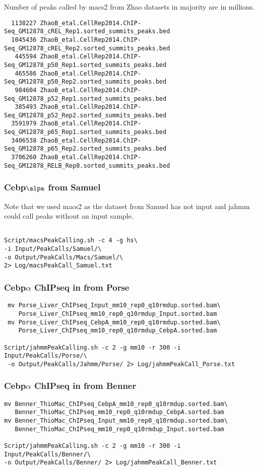 \documentclass{article}\usepackage[]{graphicx}\usepackage[]{color}
\begin{document}
Number of peaks called by macs2 from Zhao datasets in majority are in millions. 
\begin{verbatim}
  1138227 ZhaoB_etal.CellRep2014.ChIP-Seq_GM12878_cREL_Rep1.sorted_summits_peaks.bed
  1045436 ZhaoB_etal.CellRep2014.ChIP-Seq_GM12878_cREL_Rep2.sorted_summits_peaks.bed
   445594 ZhaoB_etal.CellRep2014.ChIP-Seq_GM12878_p50_Rep1.sorted_summits_peaks.bed
   465586 ZhaoB_etal.CellRep2014.ChIP-Seq_GM12878_p50_Rep2.sorted_summits_peaks.bed
   984604 ZhaoB_etal.CellRep2014.ChIP-Seq_GM12878_p52_Rep1.sorted_summits_peaks.bed
   385493 ZhaoB_etal.CellRep2014.ChIP-Seq_GM12878_p52_Rep2.sorted_summits_peaks.bed
  3591979 ZhaoB_etal.CellRep2014.ChIP-Seq_GM12878_p65_Rep1.sorted_summits_peaks.bed
  3406538 ZhaoB_etal.CellRep2014.ChIP-Seq_GM12878_p65_Rep2.sorted_summits_peaks.bed
  3706260 ZhaoB_etal.CellRep2014.ChIP-Seq_GM12878_RELB_Rep0.sorted_summits_peaks.bed
\end{verbatim}

\subsubsection{Cebp$\alpa$ from Samuel}

Note that we used macs2 as the dataset from Samuel has not input and jahmm could call peaks without an input sample.

\begin{verbatim}

Script/macsPeakCalling.sh -c 4 -g hs\ 
-i Input/PeakCalls/Samuel/\ 
-o Output/PeakCalls/Macs/Samuel/\ 
2> Log/macsPeakCall_Samuel.txt

\end{verbatim}


\subsubsection{Cebp$\alpha$ ChIPseq in from Porse}
\begin{verbatim}
 mv Porse_Liver_ChIPseq_Input_mm10_rep0_q10rmdup.sorted.bam\
    Porse_Liver_ChIPseq_mm10_rep0_q10rmdup_Input.sorted.bam 
 mv Porse_Liver_ChIPseq_CebpA_mm10_rep0_q10rmdup.sorted.bam\ 
    Porse_Liver_ChIPseq_mm10_rep0_q10rmdup_CebpA.sorted.bam 

Script/jahmmPeakCalling.sh -c 2 -g mm10 -r 300 -i Input/PeakCalls/Porse/\ 
 -o Output/PeakCalls/Jahmm/Porse/ 2> Log/jahmmPeakCall_Porse.txt
\end{verbatim}

\subsubsection{Cebp$\alpha$ ChIPseq in from Benner}
\begin{verbatim}
mv Benner_ThioMac_ChIPseq_CebpA_mm10_rep0_q10rmdup.sorted.bam\ 
   Benner_ThioMac_ChIPseq_mm10_rep0_q10rmdup_CebpA.sorted.bam
mv Benner_ThioMac_ChIPseq_Input_mm10_rep0_q10rmdup.sorted.bam\ 
   Benner_ThioMac_ChIPseq_mm10_rep0_q10rmdup_Input.sorted.bam

Script/jahmmPeakCalling.sh -c 2 -g mm10 -r 300 -i Input/PeakCalls/Benner/\ 
-o Output/PeakCalls/Benner/ 2> Log/jahmmPeakCall_Benner.txt
\end{verbatim}
\end{document}
